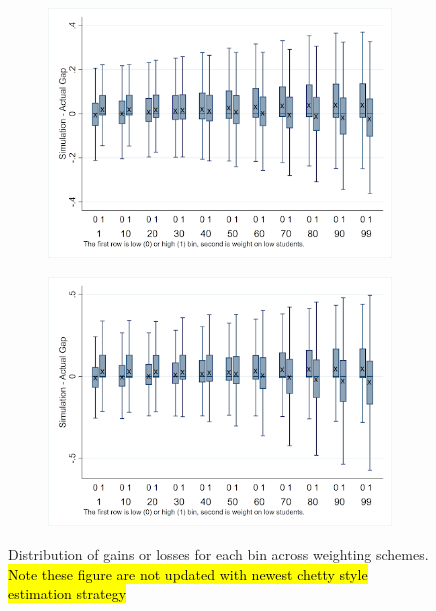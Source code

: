 \documentclass[12pt]{article}
\theoremstyle{definition}
\theoremstyle{definition}
\theoremstyle{definition}
\theoremstyle{definition}
\begin{document}
  \begin{figure}[H]
    \centering
     \begin{subfigure}[b]{0.45\textwidth}
        \includegraphics[width=1\textwidth]{Working_Paper/WP_Figures/ela_winners_losers.png}
    \end{subfigure}
     \begin{subfigure}[b]{0.45\textwidth}
        \includegraphics[width=1\textwidth]{Working_Paper/WP_Figures/Math_winners_losers.png}
    \end{subfigure}
    
    \label{fig:win_lose}
    \caption{Distribution of gains or losses for each bin across weighting schemes. \hl{Note these figure are not updated with newest chetty style estimation strategy}}
\end{figure}
\end{document}
